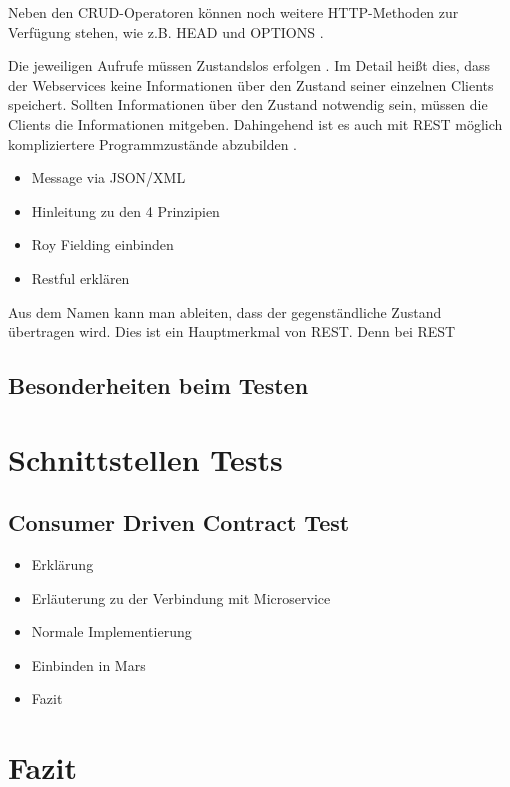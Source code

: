 \documentclass{llncs}
\begin{document}
Neben den CRUD-Operatoren können noch weitere HTTP-Methoden zur Verfügung stehen, wie z.B. HEAD und OPTIONS \cite{porres2011modeling}.

Die jeweiligen Aufrufe müssen Zustandslos erfolgen \cite{reza2010framework, porres2011modeling, kao2013performance}. Im Detail heißt dies, dass der Webservices keine Informationen über den Zustand seiner einzelnen Clients speichert. Sollten Informationen über den Zustand notwendig sein, müssen die Clients die Informationen mitgeben. Dahingehend ist es auch mit REST möglich kompliziertere Programmzustände abzubilden \cite{porres2011modeling}.

\begin{itemize}
\item Message via JSON/XML
\item Hinleitung zu den 4 Prinzipien
\item Roy Fielding einbinden
\item Restful erklären
\end{itemize}

 Aus dem Namen kann man ableiten, dass der gegenständliche Zustand übertragen wird. Dies ist ein Hauptmerkmal von REST. Denn bei REST 
\subsection{Besonderheiten beim Testen}
\section{Schnittstellen Tests}
\subsection{Consumer Driven Contract Test}
\begin{itemize}
\item Erklärung
\item Erläuterung zu der Verbindung mit Microservice
\item Normale Implementierung
\item Einbinden in Mars
\item Fazit
\end{itemize}
\section{Fazit}




\end{document}
